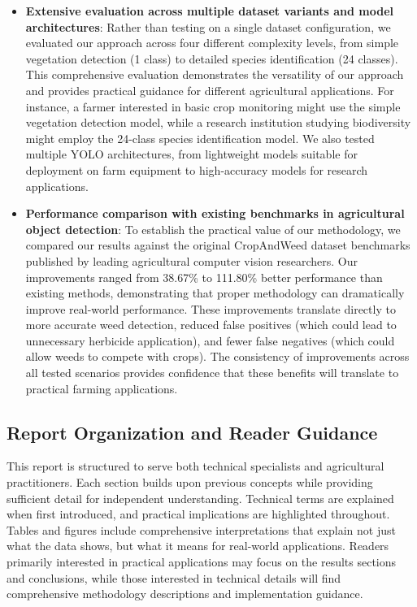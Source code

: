 \begin{itemize}
    \item \textbf{Extensive evaluation across multiple dataset variants and model architectures}: Rather than testing on a single dataset configuration, we evaluated our approach across four different complexity levels, from simple vegetation detection (1 class) to detailed species identification (24 classes). This comprehensive evaluation demonstrates the versatility of our approach and provides practical guidance for different agricultural applications. For instance, a farmer interested in basic crop monitoring might use the simple vegetation detection model, while a research institution studying biodiversity might employ the 24-class species identification model. We also tested multiple YOLO architectures, from lightweight models suitable for deployment on farm equipment to high-accuracy models for research applications.
    
    \item \textbf{Performance comparison with existing benchmarks in agricultural object detection}: To establish the practical value of our methodology, we compared our results against the original CropAndWeed dataset benchmarks published by leading agricultural computer vision researchers. Our improvements ranged from 38.67\% to 111.80\% better performance than existing methods, demonstrating that proper methodology can dramatically improve real-world performance. These improvements translate directly to more accurate weed detection, reduced false positives (which could lead to unnecessary herbicide application), and fewer false negatives (which could allow weeds to compete with crops). The consistency of improvements across all tested scenarios provides confidence that these benefits will translate to practical farming applications.
\end{itemize}

\subsection{Report Organization and Reader Guidance}

This report is structured to serve both technical specialists and agricultural practitioners. Each section builds upon previous concepts while providing sufficient detail for independent understanding. Technical terms are explained when first introduced, and practical implications are highlighted throughout. Tables and figures include comprehensive interpretations that explain not just what the data shows, but what it means for real-world applications. Readers primarily interested in practical applications may focus on the results sections and conclusions, while those interested in technical details will find comprehensive methodology descriptions and implementation guidance.
